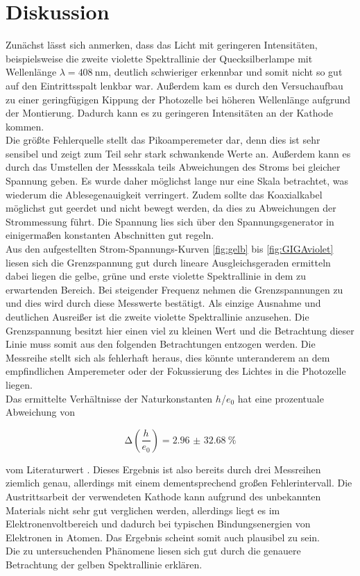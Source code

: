 \section{Diskussion}

Zunächst lässt sich anmerken, dass das Licht mit geringeren Intensitäten, beispielsweise die zweite violette Spektrallinie der Quecksilberlampe mit Wellenlänge $\lambda = \SI{408}{\nano\meter}$, deutlich schwieriger erkennbar und somit nicht 
so gut auf den Eintrittsspalt lenkbar war. Außerdem kam es durch den Versuchaufbau zu einer geringfügigen Kippung der Photozelle bei höheren Wellenlänge aufgrund der Montierung. Dadurch kann es zu geringeren Intensitäten an der Kathode kommen.
\\
\newline
Die größte Fehlerquelle stellt das Pikoamperemeter dar, denn dies ist sehr sensibel und zeigt zum Teil sehr stark schwankende Werte an. Außerdem kann es durch das Umstellen der Messskala teils Abweichungen des Stroms bei gleicher Spannung geben. Es wurde daher
möglichst lange nur eine Skala betrachtet, was wiederum die Ablesegenauigkeit verringert. Zudem sollte das Koaxialkabel möglichst gut geerdet und nicht bewegt werden, da dies zu Abweichungen der Strommessung führt. Die Spannung lies sich über den 
Spannungsgenerator in einigermaßen konstanten Abschnitten gut regeln.
\\
\newline
Aus den aufgestellten Strom-Spannungs-Kurven \ref{fig:gelb} bis \ref{fig:GIGAviolet} liesen sich die Grenzspannung gut durch lineare Ausgleichsgeraden ermitteln dabei liegen die gelbe, grüne und erste violette Spektrallinie in dem zu erwartenden 
Bereich. Bei steigender Frequenz nehmen die Grenzspannungen zu und dies wird durch diese Messwerte bestätigt. Als einzige Ausnahme und deutlichen Ausreißer ist die zweite violette Spektrallinie anzusehen. Die Grenzspannung besitzt hier einen viel zu kleinen
Wert und die Betrachtung dieser Linie muss somit aus den folgenden Betrachtungen entzogen werden. Die Messreihe stellt sich als fehlerhaft heraus, dies könnte unteranderem an dem empfindlichen Amperemeter oder der Fokussierung des Lichtes in die Photozelle liegen.
\\
\newline
Das ermittelte Verhältnisse der Naturkonstanten $h$/$e_{0}$ hat eine prozentuale Abweichung von

\begin{equation}
\increment \left( \frac{h}{e_0} \right) = \SI{2.96(3268)}{\percent} 
\end{equation}

vom Literaturwert \cite{lit}. Dieses Ergebnis ist also bereits durch drei Messreihen ziemlich genau, allerdings mit einem dementsprechend großen Fehlerintervall.
Die Austrittsarbeit der verwendeten Kathode kann aufgrund des unbekannten Materials nicht sehr gut verglichen werden, allerdings liegt es im Elektronenvoltbereich und dadurch bei typischen Bindungsenergien von Elektronen in Atomen.
Das Ergebnis scheint somit auch plausibel zu sein.
\\
\newline
Die zu untersuchenden Phänomene liesen sich gut durch die genauere Betrachtung der gelben Spektrallinie erklären.
